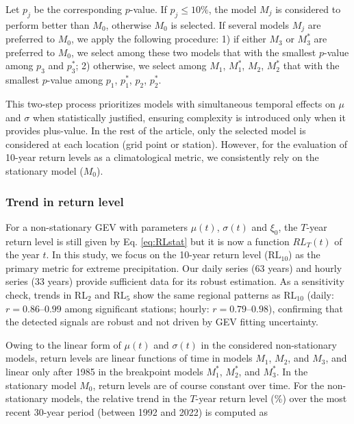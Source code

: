 \documentclass[hess, manuscript]{copernicus}
\begin{document}
 Let $p_{j}$ be the corresponding $p$-value.  If $p_{j} \le 10\%$, the model $M_{j}$ is considered to perform better than $M_{0}$, otherwise $M_{0}$ is selected. If several models $M_{j}$ are preferred to $M_{0}$, we apply the following procedure: 1) if either $M_{3}$ or $M_{3}^{*}$ are preferred to $M_{0}$, we select among these two models that with the smallest $p$-value among $p_{3}$ and $p_{3}^{*}$; 2) otherwise, we select among $M_{1}$, $M_{1}^{*}$, $M_{2}$, $M_{2}^{*}$ that with the smallest $p$-value among $p_{1}$, $p_{1}^{*}$, $p_{2}$, $p_{2}^{*}$.

This two-step process prioritizes models with simultaneous temporal
effects on \(\mu\) and \(\sigma\) when statistically justified, ensuring
complexity is introduced only when it provides plus-value. In the rest of the article, only the selected model is considered at each location (grid point or station). However, for the evaluation of 10-year return levels as a climatological metric, we consistently rely on the stationary model ($M_0$). 

\subsubsection{Trend in return level}\label{return-level}

For a non-stationary GEV with parameters $\mu(t)$, $\sigma(t)$ and $\xi_{0}$, the $T$-year return level is still given by Eq. \ref{eq:RLstat} but it is now a function $RL_T(t)$ of the year $t$. In this study, we focus on the 10-year return level ($\mathrm{RL}_{10}$) as the primary metric for extreme precipitation. Our daily series (63 years) and hourly series (33 years) provide sufficient data for its robust estimation. As a sensitivity check, trends in $\mathrm{RL}_{2}$ and $\mathrm{RL}_{5}$ show the same regional patterns as $\mathrm{RL}_{10}$ (daily: $r=0.86$--$0.99$ among significant stations; hourly: $r=0.79$--$0.98$), confirming that the detected signals are robust and not driven by GEV fitting uncertainty.

Owing to the linear form of $\mu(t)$ and $\sigma(t)$ in the considered
non-stationary models, return levels are linear functions of time in
models $M_{1}$, $M_{2}$, and $M_{3}$, and linear only after 1985 in the
breakpoint models $M_{1}^{*}$, $M_{2}^{*}$, and $M_{3}^{*}$. In the
stationary model $M_{0}$, return levels are of course constant over time.
For the non-stationary models, the relative trend in the $T$-year return
level (\%) over the most recent 30-year period (between 1992 and 2022) is computed as
\end{document}
